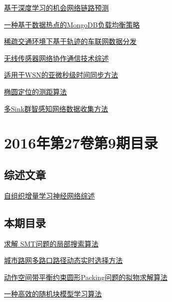\documentclass[a4paper]{article}
\begin{document}
\href{http://www.jos.org.cn/ch/reader/create_pdf.aspx?file_no=16005&year_id=2016&quarter_id=S1&falg=1}{基于深度学习的机会网络链路预测}

\href{http://www.jos.org.cn/ch/reader/create_pdf.aspx?file_no=16006&year_id=2016&quarter_id=S1&falg=1}{一种基于数据热点的MongoDB负载均衡策略}

\href{http://www.jos.org.cn/ch/reader/create_pdf.aspx?file_no=16007&year_id=2016&quarter_id=S1&falg=1}{稀疏交通环境下基于轨迹的车联网数据分发}

\href{http://www.jos.org.cn/ch/reader/create_pdf.aspx?file_no=16008&year_id=2016&quarter_id=S1&falg=1}{无线传感器网络协作通信技术综述}

\href{http://www.jos.org.cn/ch/reader/create_pdf.aspx?file_no=16009&year_id=2016&quarter_id=S1&falg=1}{适用于WSN的亚微秒级时间同步方法}

\href{http://www.jos.org.cn/ch/reader/create_pdf.aspx?file_no=16010&year_id=2016&quarter_id=S1&falg=1}{椭圆定位的测距算法}

\href{http://www.jos.org.cn/ch/reader/create_pdf.aspx?file_no=16011&year_id=2016&quarter_id=S1&falg=1}{多Sink群智感知网络数据收集方法}


\section{\textbf{2016年第27卷第9期目录}}
\subsection{综述文章}
\href{http://www.jos.org.cn/ch/reader/create_pdf.aspx?file_no=5068&year_id=2016&quarter_id=9&falg=1}{自组织增量学习神经网络综述}

\subsection{本期目录}
\href{http://www.jos.org.cn/ch/reader/create_pdf.aspx?file_no=4856&year_id=2016&quarter_id=9&falg=1}{求解 SMT问题的局部搜索算法}

\href{http://www.jos.org.cn/ch/reader/create_pdf.aspx?file_no=5063&year_id=2016&quarter_id=9&falg=1}{城市路网多路口路径动态实时选择方法}

\href{http://www.jos.org.cn/ch/reader/create_pdf.aspx?file_no=4848&year_id=2016&quarter_id=9&falg=1}{动作空间带平衡约束圆形Packing问题的拟物求解算法}

\href{http://www.jos.org.cn/ch/reader/create_pdf.aspx?file_no=4855&year_id=2016&quarter_id=9&falg=1}{一种高效的随机块模型学习算法}
\end{document}
